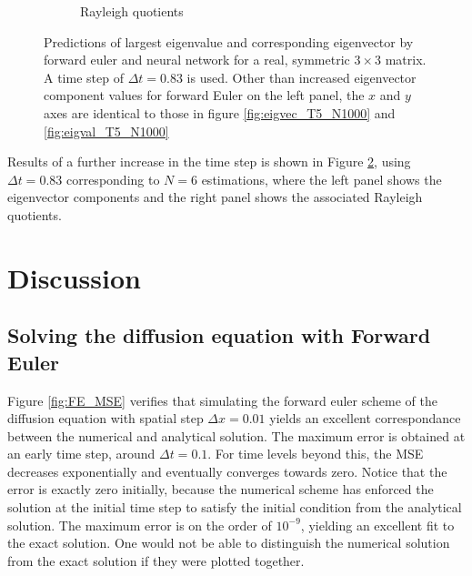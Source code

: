 \documentclass[12pt]{extarticle}
\begin{document}
\begin{figure}[h]
\begin{subfigure}{0.49\textwidth}
		\caption{Rayleigh quotients}
		\label{fig:eigval_T5_N6}
	\end{subfigure}
	\caption{Predictions of largest eigenvalue and corresponding eigenvector by forward euler and neural network for a real, symmetric $3\times 3$ matrix. A time step of $\Delta t = 0.83$ is used. Other than increased eigenvector component values for forward Euler on the left panel, the $x$ and $y$ axes are identical to those in figure \ref{fig:eigvec_T5_N1000} and \ref{fig:eigval_T5_N1000}}
	\label{fig:eig_T5_N6}
\end{figure}

Results of a further increase in the time step is shown in Figure \ref{fig:eig_T5_N6}, using $\Delta t= 0.83$ corresponding to $N=6$ estimations, where the left panel shows the eigenvector components and the right panel shows the associated Rayleigh quotients. 

 
\clearpage
\section{Discussion}

\subsection{Solving the diffusion equation with Forward Euler}
Figure \ref{fig:FE_MSE} verifies that simulating the forward euler scheme of the diffusion equation with spatial step $\Delta x = 0.01$ yields an excellent correspondance between the numerical and analytical solution. The maximum error is obtained at an early time step, around $\Delta t = 0.1$. For time levels beyond this, the MSE decreases exponentially and eventually converges towards zero. Notice that the error is exactly zero initially, because the numerical scheme has enforced the solution at the initial time step to satisfy the initial condition from the analytical solution. The maximum error is on the order of $10^{-9}$, yielding an excellent fit to the exact solution. One would not be able to distinguish the numerical solution from the exact solution if they were plotted together.
\end{document}
